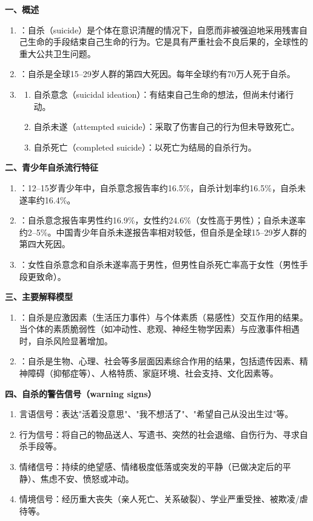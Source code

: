 \begin{keybox}
\textbf{一、概述}
\begin{enumerate}[leftmargin=*]
    \item {}：自杀（suicide）是个体在意识清醒的情况下，自愿而非被强迫地采用残害自己生命的手段结束自己生命的行为。它是具有严重社会不良后果的，全球性的重大公共卫生问题。
    \item {}：自杀是全球15--29岁人群的第四大死因。每年全球约有70万人死于自杀。
    \item {}
    \begin{enumerate}
        \item 自杀意念（suicidal ideation）：有结束自己生命的想法，但尚未付诸行动。
        \item 自杀未遂（attempted suicide）：采取了伤害自己的行为但未导致死亡。
        \item 自杀死亡（completed suicide）：以死亡为结局的自杀行为。
    \end{enumerate}
\end{enumerate}

\textbf{二、青少年自杀流行特征}
\begin{enumerate}[leftmargin=*]
    \item {}：12--15岁青少年中，自杀意念报告率约16.5\%，自杀计划率约16.5\%，自杀未遂率约16.4\%。
    \item {}：自杀意念报告率男性约16.9\%，女性约24.6\%（女性高于男性）；自杀未遂率约2--5\%。中国青少年自杀未遂报告率相对较低，但自杀是全球15--29岁人群的第四大死因。
    \item {}：女性自杀意念和自杀未遂率高于男性，但男性自杀死亡率高于女性（男性手段更致命）。
\end{enumerate}

\textbf{三、主要解释模型}
\begin{enumerate}[leftmargin=*]
    \item {}：自杀是应激因素（生活压力事件）与个体素质（易感性）交互作用的结果。当个体的素质脆弱性（如冲动性、悲观、神经生物学因素）与应激事件相遇时，自杀风险显著增加。

    \item {}：自杀是生物、心理、社会等多层面因素综合作用的结果，包括遗传因素、精神障碍（抑郁症等）、人格特质、家庭环境、社会支持、文化因素等。
\end{enumerate}

\textbf{四、自杀的警告信号（warning signs）}
\begin{enumerate}[leftmargin=*]
    \item 言语信号：表达"活着没意思"、"我不想活了"、"希望自己从没出生过"等。
    \item 行为信号：将自己的物品送人、写遗书、突然的社会退缩、自伤行为、寻求自杀手段等。
    \item 情绪信号：持续的绝望感、情绪极度低落或突发的平静（已做决定后的平静）、焦虑不安、愤怒或冲动。
    \item 情境信号：经历重大丧失（亲人死亡、关系破裂）、学业严重受挫、被欺凌/虐待等。
\end{enumerate}


\end{keybox}
